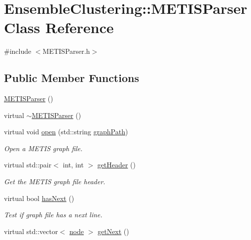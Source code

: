 \hypertarget{class_ensemble_clustering_1_1_m_e_t_i_s_parser}{\section{Ensemble\-Clustering\-:\-:M\-E\-T\-I\-S\-Parser Class Reference}
\label{class_ensemble_clustering_1_1_m_e_t_i_s_parser}
}


{\ttfamily \#include $<$M\-E\-T\-I\-S\-Parser.\-h$>$}

\subsection*{Public Member Functions}
\begin{DoxyCompactItemize}
\item 
\hyperlink{class_ensemble_clustering_1_1_m_e_t_i_s_parser_a44f5a744a2047441ff64ea1a1ab1a3fc}{M\-E\-T\-I\-S\-Parser} ()
\item 
virtual \hyperlink{class_ensemble_clustering_1_1_m_e_t_i_s_parser_a5937df5903a58e15c0df1445a70fff5c}{$\sim$\-M\-E\-T\-I\-S\-Parser} ()
\item 
virtual void \hyperlink{class_ensemble_clustering_1_1_m_e_t_i_s_parser_afa2cbafd7ae746d310bba7b6ae6539ba}{open} (std\-::string \hyperlink{class_ensemble_clustering_1_1_m_e_t_i_s_parser_a115b663b7cba22ec147d48f02c550b4a}{graph\-Path})
\begin{DoxyCompactList}\small\item\em Open a M\-E\-T\-I\-S graph file. \end{DoxyCompactList}\item 
virtual std\-::pair$<$ int, int $>$ \hyperlink{class_ensemble_clustering_1_1_m_e_t_i_s_parser_a6c11f188b2ca67435a63fc9c71d261e9}{get\-Header} ()
\begin{DoxyCompactList}\small\item\em Get the M\-E\-T\-I\-S graph file header. \end{DoxyCompactList}\item 
virtual bool \hyperlink{class_ensemble_clustering_1_1_m_e_t_i_s_parser_aa9adb857b8ff519edfe94b7bc59ef12a}{has\-Next} ()
\begin{DoxyCompactList}\small\item\em Test if graph file has a next line. \end{DoxyCompactList}\item 
virtual std\-::vector$<$ \hyperlink{namespace_ensemble_clustering_ae829290aeccd1a420b17a37fd901f114}{node} $>$ \hyperlink{class_ensemble_clustering_1_1_m_e_t_i_s_parser_a473d40949f87385130369a4f5d14b2ae}{get\-Next} ()

\end{DoxyCompactItemize}
